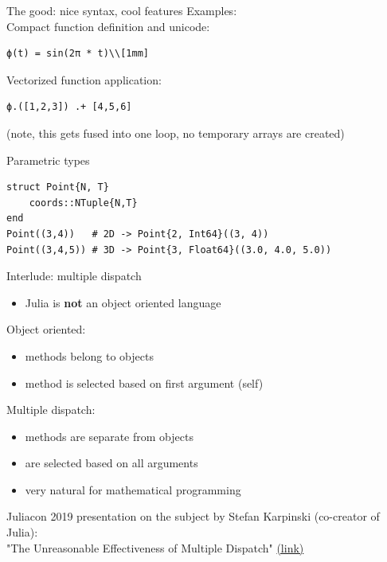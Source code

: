 \documentclass[compress,presentation,aspectratio=169]{beamer}
\begin{document}
\begin{frame}[fragile,label={sec:org8723e64}]{The good: nice syntax,
    cool features}
  \footnotesize
Examples:\\[2mm]

Compact function definition and unicode:
\begin{verbatim}
ϕ(t) = sin(2π * t)\\[1mm]
\end{verbatim}

\pause
Vectorized function application:
\begin{verbatim}
ϕ.([1,2,3]) .+ [4,5,6]
\end{verbatim}
(note, this gets fused into one loop, no temporary arrays are created)\\[1mm]
\pause

Parametric types
\begin{verbatim}
struct Point{N, T}
    coords::NTuple{N,T}
end
Point((3,4))   # 2D -> Point{2, Int64}((3, 4))
Point((3,4,5)) # 3D -> Point{3, Float64}((3.0, 4.0, 5.0))
\end{verbatim}


\end{frame}

\begin{frame}[label={sec:org1e274f0}]{Interlude: multiple dispatch}
  \footnotesize
\begin{itemize}
\item Julia is \textbf{not} an object oriented language
\end{itemize}

Object oriented:
\begin{itemize}
\item methods belong to objects
\item method is selected based on first argument (self)
\end{itemize}

Multiple dispatch:
\begin{itemize}
\item methods are separate from objects
\item are selected based on all arguments
\item very natural for mathematical programming
\end{itemize}

Juliacon 2019 presentation on the subject by Stefan Karpinski
(co-creator of Julia):\\
"The Unreasonable Effectiveness of Multiple Dispatch" \href{https://www.youtube.com/watch?v=kc9HwsxE1OY}{(link)}

\end{frame}
\end{document}
